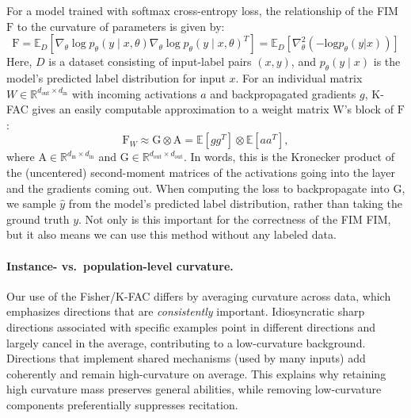 \documentclass{article} %
\newcommand{\matr}[1]{\ensuremath{\bm{\mathrm{#1}}}}
\newcommand{\RR}{\mathbb{R}}
\begin{document}
For a model trained with softmax cross-entropy loss, the relationship of the FIM \matr{F} to the curvature of parameters is given by: 
$$\matr{F}=\mathbb{E}_D[\nabla_\theta \log p_\theta(y\mid x,\theta)\nabla_\theta\log p_\theta(y\mid x,\theta)^T] =\mathbb{E}_D[\nabla_\theta^2(-\text{log}p_\theta(y|x))]$$
Here, $D$ is a dataset consisting of input-label pairs $(x, y)$, and $p_\theta(y\mid x)$ is the model's predicted label distribution for input $x$. For an individual matrix $W\in\mathbb{R}^{d_\text{out}\times d_\text{in}}$ with incoming activations $a$ and backpropagated gradients $g$, K-FAC gives an easily computable approximation to a weight matrix $\matr{W}$'s block of $\matr{F}$: 
\begin{equation}
    \matr{F}_W \approx \matr{G} \otimes \matr{A} = \mathbb{E}[gg^T] \otimes \mathbb{E}[aa^T],
    \label{eq:kfac_equation}
\end{equation}
where $\matr{A}\in \RR^{d_{\text{in}} \times d_{\text{in}}}$ and $\matr{G}\in \RR^{d_{\text{out}}\times d_{\text{out}}}$. In words, this is the Kronecker product of the (uncentered) second-moment matrices of the activations going into the layer and the gradients coming out.
When computing the loss to backpropagate into \matr{G}, we sample $\hat{y}$ from the model's predicted label distribution, rather than taking the ground truth $y$. Not only is this important for the correctness of the FIM FIM\citep{martens2015optimizing}, but it also means we can use this method without any labeled data.
\paragraph{Instance- vs.\ population-level curvature.}
Our use of the Fisher/K-FAC differs by averaging curvature across data, which emphasizes directions that
are \emph{consistently} important. Idiosyncratic sharp directions associated with specific
examples point in different directions and largely cancel in the average, contributing to a
low-curvature background. Directions that implement shared mechanisms (used by many inputs)
add coherently and remain high-curvature on average. This explains why retaining high
curvature mass preserves general abilities, while removing low-curvature components
preferentially suppresses recitation.
    
\end{document}
